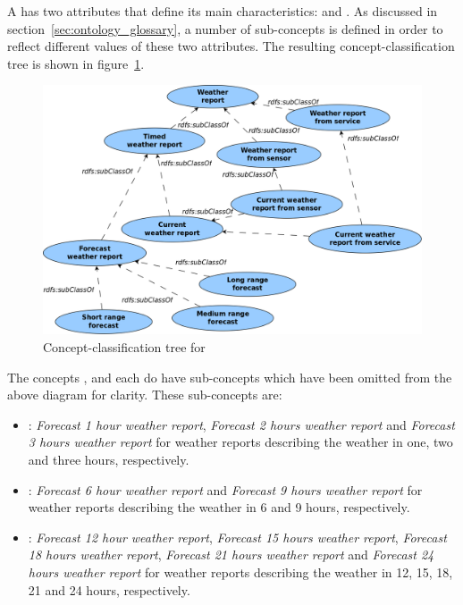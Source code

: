 A  has two attributes that define its main characteristics:  and . As discussed in section~\ref{sec:ontology_glossary}, a number of sub-concepts is defined in order to reflect different values of these two attributes. The resulting concept-classification tree is shown in figure~\ref{fig:tree_weather_report}.

\begin{figure}
  \centering
  \includegraphics[width=\textwidth]{figures/diagrams/weather-report.png}
  \caption{Concept-classification tree for }
  \label{fig:tree_weather_report}
\end{figure}

The concepts ,  and  each do have sub-concepts which have been omitted from the above diagram for clarity. These sub-concepts are:
\begin{itemize}
  \item {}: \emph{Forecast 1 hour weather report}, \emph{Forecast 2 hours weather report} and \emph{Forecast 3 hours weather report} for weather reports describing the weather in one, two and three hours, respectively.
  \item {}: \emph{Forecast 6 hour weather report} and \emph{Forecast 9 hours weather report} for weather reports describing the weather in 6 and 9 hours, respectively.
  \item {}: \emph{Forecast 12 hour weather report}, \emph{Forecast 15 hours weather report}, \emph{Forecast 18 hours weather report}, \emph{Forecast 21 hours weather report} and \emph{Forecast 24 hours weather report} for weather reports describing the weather in 12, 15, 18, 21 and 24 hours, respectively.
\end{itemize}

